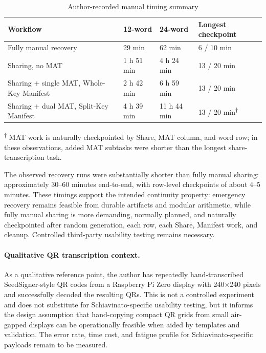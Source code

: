 \documentclass[11pt]{article}
\begin{document}
\begin{table}[H]
\centering
\caption{Author-recorded manual timing summary}
\label{tab:manual-timing-summary}
\footnotesize
\begin{tabular}{@{}p{}p{}p{}p{}@{}}
\toprule
\textbf{Workflow} & \textbf{12-word} & \textbf{24-word} & \textbf{Longest checkpoint} \\ \midrule
Fully manual recovery & 29 min & 62 min & 6 / 10 min \\
Sharing, no MAT & 1 h 51 min & 4 h 24 min & 13 / 20 min \\
Sharing + single MAT, Whole-Key Manifest & 2 h 42 min & 6 h 59 min & 13 / 20 min \\
Sharing + dual MAT, Split-Key Manifest & 4 h 39 min & 11 h 44 min & 13 / 20 min\textsuperscript{$\dagger$} \\
\bottomrule
\end{tabular}

\medskip
\footnotesize
\textsuperscript{$\dagger$} MAT work is naturally checkpointed by Share, MAT column, and word row; in these observations, added MAT subtasks were shorter than the longest share-transcription task.
\end{table}

The observed recovery runs were substantially shorter than fully manual sharing: approximately 30--60 minutes end-to-end, with row-level checkpoints of about 4--5 minutes. These timings support the intended continuity property: emergency recovery remains feasible from durable artifacts and modular arithmetic, while fully manual sharing is more demanding, normally planned, and naturally checkpointed after random generation, each row, each Share, Manifest work, and cleanup. Controlled third-party usability testing remains necessary.

\paragraph{Qualitative QR transcription context.} As a qualitative reference point, the author has repeatedly hand-transcribed SeedSigner-style QR codes from a Raspberry Pi Zero display with 240$\times$240 pixels and successfully decoded the resulting QRs. This is not a controlled experiment and does not substitute for Schiavinato-specific usability testing, but it informs the design assumption that hand-copying compact QR grids from small air-gapped displays can be operationally feasible when aided by templates and validation. The error rate, time cost, and fatigue profile for Schiavinato-specific payloads remain to be measured.
\end{document}
